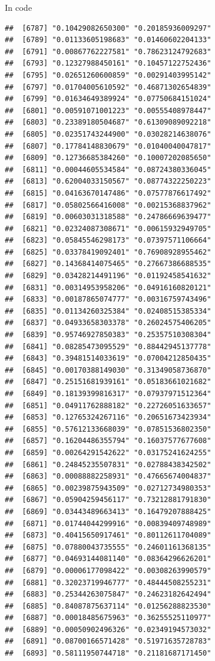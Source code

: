 \documentclass[ignorenonframetext,]{beamer}
\begin{document}
\begin{frame}[fragile]{In code}
\begin{verbatim}
##  [6787] "0.10429082650300" "0.20185936009297"
##  [6789] "0.01133605198683" "0.01460602204133"
##  [6791] "0.00867762227581" "0.78623124792683"
##  [6793] "0.12327988450161" "0.10457122752436"
##  [6795] "0.02651260600859" "0.00291403995142"
##  [6797] "0.01704005610592" "0.46871302654839"
##  [6799] "0.01634649389924" "0.07750684151024"
##  [6801] "0.00591071001223" "0.00555408978447"
##  [6803] "0.23389180504687" "0.61309089092218"
##  [6805] "0.02351743244900" "0.03028214638076"
##  [6807] "0.17784148830679" "0.01040040047817"
##  [6809] "0.12736685384260" "0.10007202085650"
##  [6811] "0.00044605534584" "0.08724380336045"
##  [6813] "0.62004033150567" "0.08774322250223"
##  [6815] "0.04163670147486" "0.07577876617492"
##  [6817] "0.05802566416008" "0.00215368837962"
##  [6819] "0.00603031318588" "0.24786669639477"
##  [6821] "0.02324087308671" "0.00615932949705"
##  [6823] "0.05845546298173" "0.07397571106664"
##  [6825] "0.03378419092401" "0.76908928955462"
##  [6827] "0.14368414075465" "0.27667386688535"
##  [6829] "0.03428214491196" "0.01192458541632"
##  [6831] "0.00314953958206" "0.04916160820121"
##  [6833] "0.00187865074777" "0.00316759743496"
##  [6835] "0.01134260325384" "0.02408515385334"
##  [6837] "0.04933658303378" "0.26024575406205"
##  [6839] "0.95746927850383" "0.25357510308304"
##  [6841] "0.08285473095529" "0.88442945137778"
##  [6843] "0.39481514033619" "0.07004212850435"
##  [6845] "0.00170388149030" "0.31349058736870"
##  [6847] "0.25151681939161" "0.05183661021682"
##  [6849] "0.18139399816317" "0.07937971512364"
##  [6851] "0.04911762888182" "0.22726051633657"
##  [6853] "0.12765324267116" "0.20651673423934"
##  [6855] "0.57612133668039" "0.07851536802350"
##  [6857] "0.16204486355794" "0.16037577677608"
##  [6859] "0.00264291542622" "0.03175241624255"
##  [6861] "0.24845235507831" "0.02788438342502"
##  [6863] "0.00088882258931" "0.47665674004837"
##  [6865] "0.00239875943509" "0.02712734980353"
##  [6867] "0.05904259456117" "0.73212881791830"
##  [6869] "0.03443489663413" "0.16479207888425"
##  [6871] "0.01744044299916" "0.00839409748989"
##  [6873] "0.40415650917461" "0.80112611704089"
##  [6875] "0.07880043735555" "0.24601161368135"
##  [6877] "0.04693144081140" "0.08364296626201"
##  [6879] "0.00006177098422" "0.00308263990579"
##  [6881] "0.32023719946777" "0.48444508255231"
##  [6883] "0.25344263075847" "0.24623182642494"
##  [6885] "0.84087875637114" "0.01256288823530"
##  [6887] "0.00018485675963" "0.36255525110977"
##  [6889] "0.00050902496326" "0.02349194573032"
##  [6891] "0.08700166571428" "0.51971635728783"
##  [6893] "0.58111950744718" "0.21181687171450"

\end{verbatim}
\end{frame}
\end{document}
